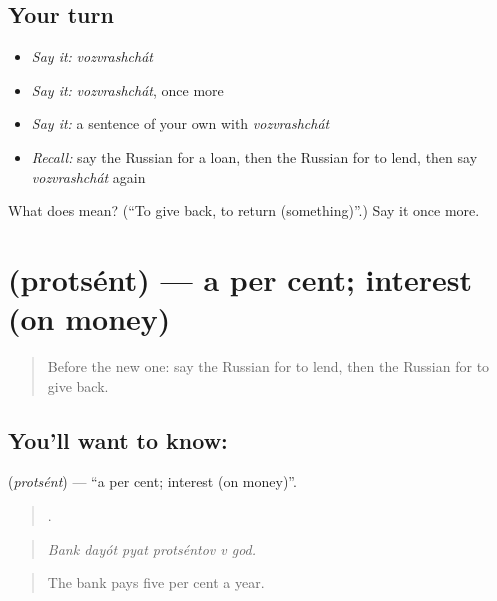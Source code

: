 \subsection*{Your turn}
\begin{itemize}
\raggedright
  \item \emph{Say it:} \emph{vozvrashchát}
  \item \emph{Say it:} \emph{vozvrashchát}, once more
  \item \emph{Say it:} a sentence of your own with \emph{vozvrashchát}
  \item \emph{Recall:} say the Russian for a loan, then the Russian for to lend, then say \emph{vozvrashchát} again
\end{itemize}

\begin{tcolorbox}[breakable,colback=teal!4,colframe=teal!35!black,title={Before you move on}]
What does  mean? (\textquotedblleft{}To give back, to return (something)\textquotedblright{}.) Say it once more.
\end{tcolorbox}
\section[\texorpdfstring{\ru{процент} (protsént)}{процент (protsént)}]{ (protsént) — a per cent; interest (on money)}

\label{lesson:RU-C394-procent}



\begin{quote}
Before the new one: say the Russian for to lend, then the Russian for to give back.
\end{quote}

\subsection*{You'll want to know: }
\textbf{} (\emph{protsént}) — \textquotedblleft{}a per cent; interest (on money)\textquotedblright{}.

\begin{quote}
     .
\end{quote}

\begin{quote}
\emph{Bank dayót pyat protséntov v god.}
\end{quote}

\begin{quote}
The bank pays five per cent a year.
\end{quote}

